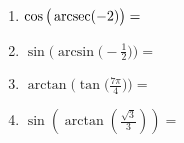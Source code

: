 \documentclass{ximera}
\begin{document}
\begin{exercise}
\begin{enumerate}
\begin{multipleChoice}
	\choice{$\pi$}
\end{multipleChoice}
%
\item $\cos\big(\operatorname{arcsec}(-2)\big) =$ 
\begin{multipleChoice}
\end{multipleChoice}
%
\item $\sin\!\Big(\arcsin\!\Big(\!-\frac{1}{2}\Big)\Big) = $
\begin{multipleChoice}
\end{multipleChoice}
%
\item $\arctan\!\Big(\tan\!\Big(\frac{7\pi}{4}\Big)\Big) = $
\begin{multipleChoice}
	\choice{$\pi$}
\end{multipleChoice}
%
\item $\sin\left(\arctan\left(\frac{\sqrt{3}}{3}\right)\right) = $
\begin{multipleChoice}
\end{multipleChoice}
%
\end{enumerate}
\end{exercise}
\end{document}
